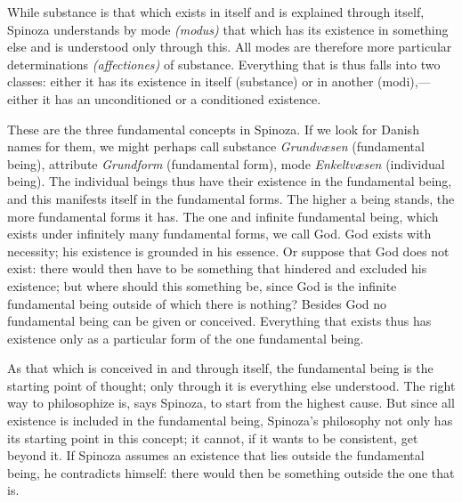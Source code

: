 \documentclass[12pt]{book}
\newcommand{\opage}[1]{\marginnote{\footnotesize\textit{[#1]}}}
\begin{document}
While substance is that which exists in itself and is explained through itself,
Spinoza understands by mode \textit{(modus)} that which has its existence in something
else and is understood only through this. All modes are therefore more particular
determinations \textit{(affectiones)} of substance. Everything that is thus falls into
two classes: either it has its existence in itself (substance) or in another (modi),---
either it has an unconditioned or a conditioned existence.

These are the three fundamental concepts in Spinoza. If we look for Danish names for
them, we might perhaps call substance \textit{Grundvæsen} (fundamental being),
attribute \textit{Grundform} (fundamental form), mode \textit{Enkeltvæsen} (individual
being). The individual beings thus have their existence in the fundamental being, and
this manifests itself in the fundamental forms. The higher a being stands, the more
fundamental forms it has. The one and infinite fundamental being, which exists under
infinitely many fundamental forms, we call God. God exists with necessity; his
existence is grounded in his essence. Or \opage{74}suppose that God does not exist:
there would then have to be something that hindered and excluded his existence; but
where should this something be, since God is the infinite fundamental being outside of
which there is nothing? Besides God no fundamental being can be given or conceived.
Everything that exists thus has existence only as a particular form of the one
fundamental being.

As that which is conceived in and through itself, the fundamental being is the starting
point of thought; only through it is everything else understood. The right way to
philosophize is, says Spinoza, to start from the highest cause. But since all existence
is included in the fundamental being, Spinoza's philosophy not only has its starting
point in this concept; it cannot, if it wants to be consistent, get beyond it. If
Spinoza assumes an existence that lies outside the fundamental being, he contradicts
himself: there would then be something outside the one that is.
\end{document}
